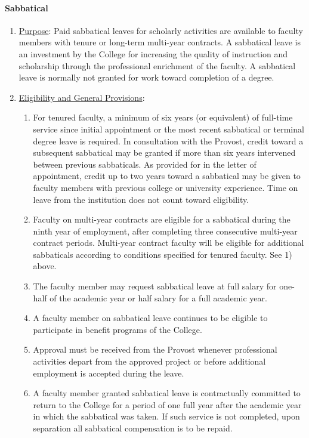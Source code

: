 			\paragraph{Sabbatical}
				\begin{enumerate}[label=\alph*)]

					\item{\underline{Purpose}: Paid sabbatical leaves for
						scholarly activities are available to faculty members with
						tenure or long-term multi-year contracts.  A sabbatical
						leave is an investment by the College for increasing the
						quality of instruction and scholarship through the
						professional enrichment of the faculty.  A sabbatical leave
						is normally not granted for work toward completion of a
						degree.}

					\item{\underline{Eligibility and General Provisions}:
						\begin{enumerate}[label=\arabic*)]
							\item{For tenured faculty, a minimum of six years (or equivalent) of full-time service since initial appointment or the most recent sabbatical or terminal degree leave is required.  In consultation with the Provost, credit toward a subsequent sabbatical may be granted if more than six years intervened between previous sabbaticals.  As provided for in the letter of appointment, credit up to two years toward a sabbatical may be given to faculty members with previous college or university experience.  Time on leave from the institution does not count toward eligibility.}
							\item{Faculty on multi-year contracts are eligible for a sabbatical during the ninth year of employment, after completing three consecutive multi-year contract periods.  Multi-year contract faculty will be eligible for additional sabbaticals according to conditions specified for tenured faculty.  See 1) above.}
							\item{The faculty member may request sabbatical leave at full salary for one-half of the academic year or half salary for a full academic year.}
							\item{A faculty member on sabbatical leave continues to be eligible to participate in benefit programs of the College.}
							\item{Approval must be received from the Provost whenever professional activities depart from the approved project or before additional employment is accepted during the leave.}
							\item{A faculty member granted sabbatical leave is contractually committed to return to the College for a period of one full year after the academic year in which the sabbatical was taken.  If such service is not completed, upon separation all sabbatical compensation is to be repaid.}

\end{enumerate}}
\end{enumerate}
